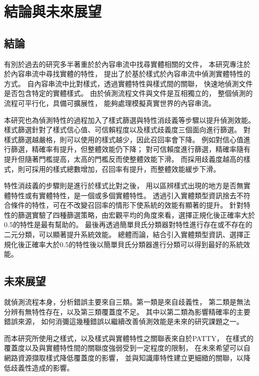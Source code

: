 %
%
%
\chapter{結論與未來展望}
\label{c:future}

\section{結論}
有別於過去的研究多半著重於於內容串流中找尋實體相關的文件，
本研究專注於於內容串流中尋找實體的特性，
提出了於基於樣式於內容串流中偵測實體特性的方式。
自內容串流中比對樣式，透過實體特性與樣式間的關聯，
快速地偵測文件是否包含特定的實體樣式。
由於偵測流程文件與文件是互相獨立的，
整個偵測的流程可平行化，具備可擴展性，
能夠處理模擬真實世界的內容串流。

本研究也為偵測特性的過程加入了樣式篩選與特性消歧義等步驟以提升偵測效能。
樣式篩選針對了樣式信心值、可信賴程度以及樣式歧義度三個面向進行篩選。
對樣式篩選越嚴格，則可以使用的樣式越少，因此召回率會下降。
例如對信心值進行篩選，精確率有提升，但整體效能仍下降；
對可信賴度進行篩選，精確率隨有提升但隨著門檻提高，太高的門檻反而使整體效能下滑。
而採用歧義度越高的樣式，則可採用的樣式總數增加，召回率有提升，而整體效能緩步下滑。

特性消歧義的步驟則是進行於樣式比對之後，
用以區辨樣式出現的地方是否無實體特性或有實體特性，是一個或多個實體特性。
透過引入實體類型資訊捨去不符合條件的特性，可在不改變召回率的情形下使系統的效能有顯著的提升。
針對特性的篩選實驗了四種篩選策略，由宏觀平均的角度來看，選擇正規化後正確率大於0.5的特性是最有幫助的。
最後再透過簡單貝氏分類器對特性進行存在或不存在的二元分類，可以顯著提升系統效能。
總體而論，結合引入實體類型資訊、選擇正規化後正確率大於0.5的特性後以簡單貝氏分類器進行分類可以得到最好的系統效能。

\section{未來展望}
就偵測流程本身，分析錯誤主要來自三類。第一類是來自歧義性，
第二類是無法分辨有無特性存在，以及第三類覆蓋度不足。
其中以第二類為影響精確率的主要錯誤來源，
如何消彌這幾種錯誤以繼續改善偵測效能是未來的研究課題之一。

而本研究所使用之樣式，以及樣式與實體特性之關聯表來自於PATTY，
在樣式的覆蓋度以及與實體特性間的關聯度強弱受到一定程度的限制，
在未來希望可以自網路資源擷取樣式降低覆蓋度的影響，
並與知識庫特性建立更細緻的關聯，以降低歧義性造成的影響。

